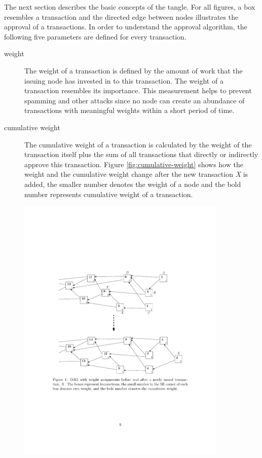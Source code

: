The next section describes the basic concepts of the tangle. For all figures, a box resembles a transaction and the directed edge between nodes illustrates the approval of a transactions. In order to understand the approval algorithm, the following five parameters are defined for every transaction.
\begin{description}
    \item[weight] The weight of a transaction is defined by the amount of work that the issuing node has invested in to this transaction. The weight of a transaction resembles its importance. This measurement helps to prevent spamming and other attacks since no node can create an abundance of transactions with meaningful weights within a short period of time. 
    \item[cumulative weight] The cumulative weight of a transaction is calculated by the weight of the transaction itself plus the sum of all transactions that directly or indirectly approve this transaction. Figure \ref{fig:cumulative-weight} shows how the weight and the cumulative weight change after the new transaction \textit{X} is added, the smaller number denotes the weight of a node and the bold number represents cumulative weight of a transaction.\par
        \begin{minipage}{\linewidth}
            \centering
            \includegraphics[width=10cm]{images/cummulative_weight.pdf}

\end{minipage}
\end{description}
